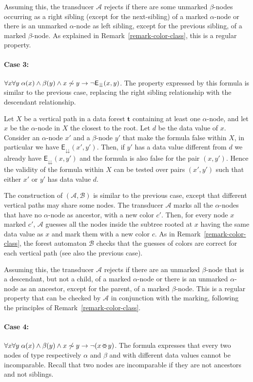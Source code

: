 \documentclass{CSML}
\newcommand\dataeq{\ensuremath{\sim}}
\newcommand\Aa{\mathcal{A}}
\newcommand\Ba{\mathcal{B}}
\newcommand\tree{\boldsymbol{t}}
\newcommand\EE{\mathsf{E}}
\newcommand\SAD{\EE_{\downdownarrows}}
\renewcommand\parallel{\mathbin{\!<\mkern-12mu>\!}}
\begin{document}
Assuming this, the transducer $\Aa$ rejects if there are some unmarked
$\beta$-nodes occurring as a right sibling (except for the next-sibling) of a
marked $\alpha$-node or there is an unmarked $\alpha$-node as
left sibling, except for the previous sibling, of a marked $\beta$-node.  
As explained in Remark~\ref{remark-color-class}, this is a regular property.


\paragraph{\bf Case 3:}
$\forall x \forall y\; \alpha(x) \wedge \beta(y) \wedge x \not\dataeq y \to \neg \SAD(x, y)$.
The property expressed by this formula is similar to the previous case,
replacing the right sibling relationship with the descendant relationship.

Let $X$ be a vertical path in a data forest $\tree$ containing at least one
$\alpha$-node, and let $x$ be the $\alpha$-node in $X$ the closest to
the root. Let $d$ be the data value of $x$.
Consider an $\alpha$-node $x'$ and a $\beta$-node $y'$ that make the formula
false within $X$, in particular we have $\SAD(x',y')$. Then, if $y'$ has a data
value different from $d$ we already have $\SAD(x,y')$ and the formula is
also false for the pair $(x,y')$.
Hence the validity of the formula within $X$ can be tested over pairs $(x',y')$ such that
either $x'$ or $y'$ has data value $d$.

\noindent
The construction of $(\Aa,\Ba)$ is similar to the previous case, except that different
vertical paths may share some nodes.
The transducer $\Aa$ marks all the $\alpha$-nodes 
that have no $\alpha$-node as ancestor, with a new color $c'$. 
Then, for every node $x$ marked $c'$, $\Aa$ guesses all the
nodes inside the subtree rooted at $x$ having the same data value as
$x$ and mark them with a new color $c$.
As in Remark~\ref{remark-color-class}, the forest automaton $\Ba$ checks that the guesses of
colors are correct for each vertical path (see also the previous case).

Assuming this, the transducer $\Aa$ rejects if there are an unmarked
$\beta$-node that is a descendant, but not a child, of a
marked $\alpha$-node or there is an unmarked $\alpha$-node as
an ancestor, except for the parent, of a marked $\beta$-node.  
This is a regular property that can be checked by $\Aa$ in conjunction with the marking,
following the principles of Remark~\ref{remark-color-class}. 

\paragraph{\bf Case 4:}
$\forall x \forall y\; \alpha(x) \wedge \beta(y) \wedge x \not\dataeq y \to 
\neg (x \parallel y)$.
The formula expresses that every two nodes of type respectively $\alpha$ and
$\beta$ and with different data values cannot be incomparable.
Recall that two nodes are incomparable if they are not ancestors and not siblings.
\end{document}
